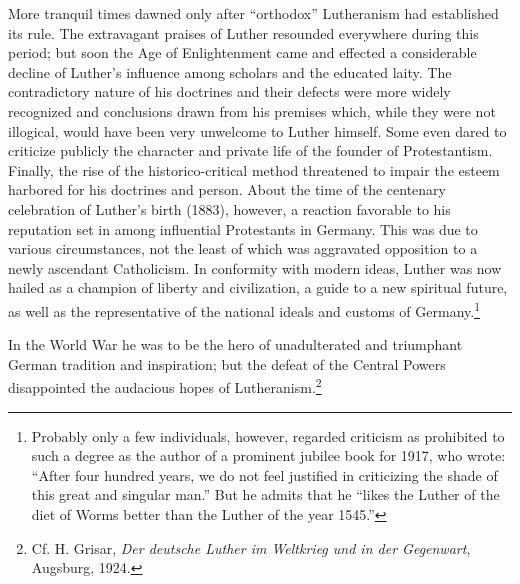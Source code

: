 More tranquil times dawned only after “orthodox” Lutheranism had established
its rule. The extravagant praises of Luther
resounded everywhere during this period; but soon the Age of Enlightenment
came and effected a considerable decline of Luther’s influence among scholars
and the educated laity. The contradictory
nature of his doctrines and their defects were more widely recognized
and conclusions drawn from his premises which, while they were not
illogical, would have been very unwelcome to Luther himself. Some
even dared to criticize publicly the character and private life of the
founder of Protestantism. Finally, the rise of the historico-critical
method threatened to impair the esteem harbored for his doctrines
and person. About the time of the centenary celebration of Luther’s
birth (1883), however, a reaction favorable to his reputation set in
among influential Protestants in Germany. This was due to various
circumstances, not the least of which was aggravated opposition to
a newly ascendant Catholicism. In conformity with modern ideas,
Luther was now hailed as a champion of liberty and civilization, a
guide to a new spiritual future, as well as the representative of the
national ideals and customs of Germany.\footnote
{Probably only a few individuals, however, regarded criticism as prohibited to such a
degree as the author of a prominent jubilee book for 1917, who wrote: “After four hundred
years, we do not feel justified in criticizing the shade of this great and singular man.”
But he admits that he “likes the Luther of the diet of Worms better than the Luther of
the year 1545.”}

In the World War he was
to be the hero of unadulterated and triumphant German tradition and
inspiration; but the defeat of the Central Powers disappointed the
audacious hopes of Lutheranism.\footnote
{Cf. H. Grisar, \textit{Der deutsche Luther im Weltkrieg und in der Gegenwart}, Augsburg,
1924.}

